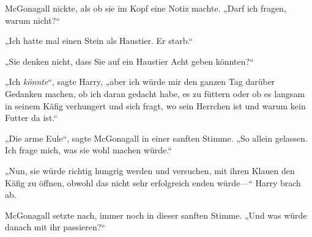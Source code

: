 McGonagall nickte, als ob sie im Kopf eine Notiz machte. „Darf ich fragen, warum nicht?“

„Ich hatte mal einen Stein als Haustier. Er starb.“

„Sie denken nicht, dass Sie auf ein Haustier Acht geben könnten?“

„Ich \emph{könnte}“, sagte Harry, „aber ich würde mir den ganzen Tag darüber Gedanken machen, ob ich daran gedacht habe, es zu füttern oder ob es langsam in seinem Käfig verhungert und sich fragt, wo sein Herrchen ist und warum kein Futter da ist.“

„Die arme Eule“, sagte McGonagall in einer sanften Stimme. „So allein gelassen. Ich frage mich, was sie wohl machen würde.“

„Nun, sie würde richtig hungrig werden und versuchen, mit ihren Klauen den Käfig zu öffnen, obwohl das nicht sehr erfolgreich enden würde—“ Harry brach ab.

McGonagall setzte nach, immer noch in dieser sanften Stimme. „Und was würde danach mit ihr passieren?“

